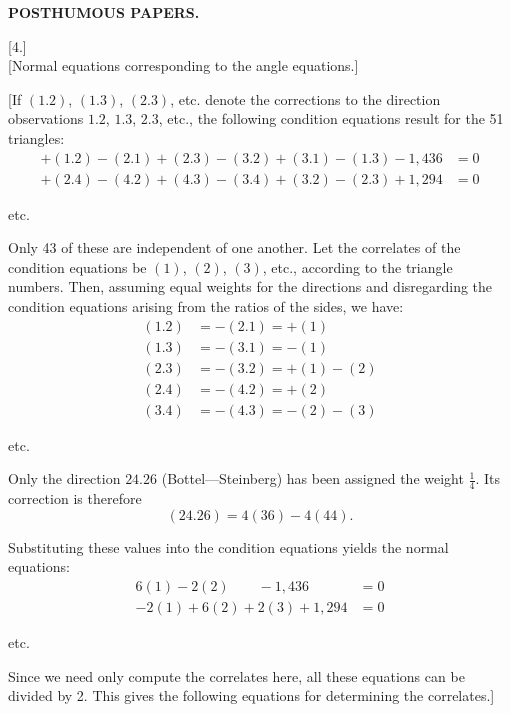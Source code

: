 \hfill\textbf{POSTHUMOUS PAPERS.}
\begin{center}[4.]\\[4pt]
[Normal equations corresponding to the angle equations.]\end{center}

[If $(1.2)$, $(1.3)$, $(2.3)$, etc. denote the corrections to the direction observations
$1.2$, $1.3$, $2.3$, etc., the following condition equations result
for the 51 triangles:
\[
\begin{aligned}
+(1.2)-(2.1)+(2.3)-(3.2)+(3.1)-(1.3)-1{,}436&=0\\
+(2.4)-(4.2)+(4.3)-(3.4)+(3.2)-(2.3)+1{,}294&=0
\end{aligned}
\]
\begin{center}etc.\end{center}

Only 43 of these are independent of one another. Let the correlates
of the condition equations be $(1)$, $(2)$, $(3)$, etc., according to the triangle numbers.
Then, assuming equal weights for the directions
and disregarding the condition equations arising from the ratios of the sides,
we have:
\[
\begin{aligned}
(1.2)&=-(2.1)=+(1)\\
(1.3)&=-(3.1)=-(1)\\
(2.3)&=-(3.2)=+(1)-(2)\\
(2.4)&=-(4.2)=+(2)\\
(3.4)&=-(4.3)=-(2)-(3)
\end{aligned}
\]
\begin{center}etc.\end{center}

Only the direction $24.26$ (Bottel---Steinberg) has been assigned the weight $\frac14$.
Its correction is therefore
\[
(24.26)=4(36)-4(44).
\]

Substituting these values into the condition equations yields
the normal equations:
\[
\begin{aligned}
6(1)-2(2)\qquad-1{,}436&=0\\
-2(1)+6(2)+2(3)+1{,}294&=0
\end{aligned}
\]
\begin{center}etc.\end{center}

Since we need only compute the correlates here,
all these equations can be divided by 2. This gives
the following equations for determining the correlates.]

